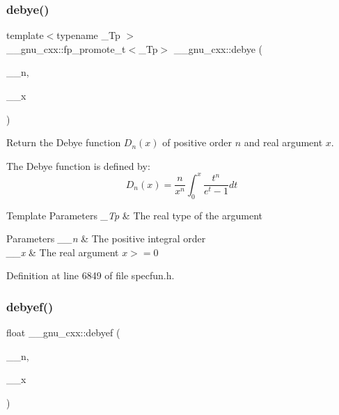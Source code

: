 \subsubsection{\texorpdfstring{debye()}{debye()}}
{\footnotesize\ttfamily template$<$typename \+\_\+\+Tp $>$ \\
\+\_\+\+\_\+gnu\+\_\+cxx\+::fp\+\_\+promote\+\_\+t$<$\+\_\+\+Tp$>$ \+\_\+\+\_\+gnu\+\_\+cxx\+::debye (\begin{DoxyParamCaption}\item[{unsigned int}]{\+\_\+\+\_\+n,  }\item[{\+\_\+\+Tp}]{\+\_\+\+\_\+x }\end{DoxyParamCaption})\hspace{0.3cm}{\ttfamily [inline]}}

Return the Debye function $ D_n(x) $ of positive order $ n $ and real argument $ x $.

The Debye function is defined by\+: \[ D_n(x) = \frac{n}{x^n}\int_{0}^{x}\frac{t^n}{e^t-1}dt \]


\begin{DoxyTemplParams}{Template Parameters}
{\em \+\_\+\+Tp} & The real type of the argument \\
\hline
\end{DoxyTemplParams}

\begin{DoxyParams}{Parameters}
{\em \+\_\+\+\_\+n} & The positive integral order \\
\hline
{\em \+\_\+\+\_\+x} & The real argument $ x >= 0 $ \\
\hline
\end{DoxyParams}


Definition at line 6849 of file specfun.\+h.

\mbox{\label{group__gnu__math__spec__func_ga683d3a885913b52db128aa5d624984a4}} 
\subsubsection{\texorpdfstring{debyef()}{debyef()}}
{\footnotesize\ttfamily float \+\_\+\+\_\+gnu\+\_\+cxx\+::debyef (\begin{DoxyParamCaption}\item[{unsigned int}]{\+\_\+\+\_\+n,  }\item[{float}]{\+\_\+\+\_\+x }\end{DoxyParamCaption})\hspace{0.3cm}{\ttfamily [inline]}}

